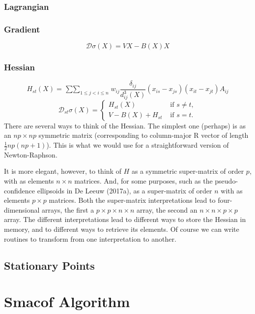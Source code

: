 \documentclass[
  12pt,
]{article}
\newcommand{\jis}{\mathop{\sum\sum}_{1\leq j<i\leq n}}
\begin{document}
\subsubsection{Lagrangian}\label{lagrangian}

\subsubsection{Gradient}\label{gradient}

\[
\mathcal{D}\sigma(X)=VX-B(X)X
\]

\subsubsection{Hessian}\label{hessian}

\[
H_{st}(X)=\jis w_{ij}\frac{\delta_{ij}}{d_{ij}^3(X)}(x_{is}-x_{js})(x_{it}-x_{jt})A_{ij}
\]
\[
\mathcal{D}_{st}\sigma(X)=\begin{cases}H_{st}(X)&\text{ if }s\not= t,\\
V-B(X)+H_{st}&\text{ if }s= t.
\end{cases}
\]
There are several ways to think of the Hessian. The simplest one
(perhaps) is as an \(np\times np\) symmetric matrix (corresponding to
column-major R vector of length \(\frac12 np(np+1)\)). This is what we
would use for a straightforward version of Newton-Raphson.

It is more elegant, however, to think of \(H\) as a symmetric super-matrix
of order \(p\), with as elements \(n\times n\) matrices. And, for some
purposes, such as the pseudo-confidence ellipsoids in De Leeuw (2017a), as
a super-matrix of order \(n\) with as elements \(p\times p\) matrices. Both
the super-matrix interpretations lead to four-dimensional arrays, the
first a \(p\times p\times n\times n\) array, the second an
\(n\times n\times p\times p\) array. The different interpretations lead to
different ways to store the Hessian in memory, and to different ways to
retrieve its elements. Of course we can write routines to transform from
one interpretation to another.

\subsection{Stationary Points}\label{stationary-points}

\section{Smacof Algorithm}\label{smacof-algorithm}
\end{document}
